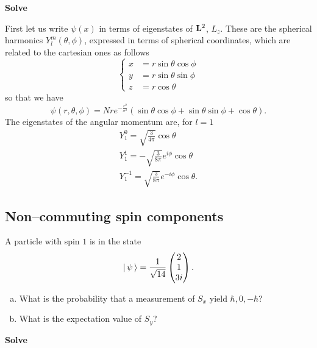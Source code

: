 \textbf{Solve}

First let us write $\psi(x)$ in terms of eigenstates of $\mathbf{L}^2$, $L_z$. These are the spherical harmonics $Y_l^m (\theta, \phi)$, expressed in terms of spherical coordinates, which are related to the cartesian ones as follows
\begin{equation}
    \begin{cases}
        x & = r \sin \theta \cos \phi \\
        y & = r \sin \theta \sin \phi \\
        z & = r \cos \theta 
    \end{cases}
\end{equation}
so that we have 
\begin{equation}
    \psi(r, \theta, \phi) = N r e^{-\frac{r^2}{\sigma^2}} ( \sin \theta \cos \phi + \sin \theta \sin \phi  + \cos \theta).
\end{equation}
The eigenstates of the angular momentum are, for $l=1$
\begin{gather}
    Y_1^0 = \sqrt{\frac{3}{4 \pi}} \cos \theta \\
    Y_1^1 = - \sqrt{\frac{3}{8 \pi}} e^{i \phi} \cos \theta \\
    Y_1^{-1} = \sqrt{\frac{3}{8 \pi}} e^{-i \phi} \cos \theta.
\end{gather}
\subsection{Non--commuting spin components}
A particle with spin $1$ is in the state
\begin{equation}
    | \, \psi \, \rangle = \frac{1}{\sqrt{14}} 
    \begin{pmatrix}
        2 \\
        1 \\
        3i
    \end{pmatrix}.
\end{equation}
\begin{enumerate}[(a)]
    \item What is the probability that a measurement of $S_x$ yield $\hbar, 0, -\hbar$?
    \item What is the expectation value of $S_y$?
\end{enumerate}

\textbf{Solve}

